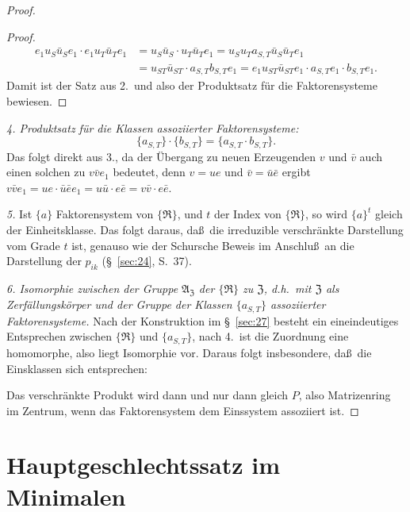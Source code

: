 \documentclass[12pt,a4paper]{article}
\theoremstyle{plain}
\theoremstyle{definition}
\theoremstyle{remark}
\begin{document}
\begin{proof}
\begin{proof}
\begin{align*}
e_{1}u_{S}\bar{u}_{S}e_{1} \cdot e_{1}u_{T}\bar{u}_{T}e_{1}
&= u_{S}\bar{u}_{S} \cdot u_{T}\bar{u}_{T}e_{1}
= u_{S}u_{T}a_{S,T}\bar{u}_{S}\bar{u}_{T}e_{1} \\
&= u_{ST}\bar{u}_{ST} \cdot a_{S,T}b_{S,T}e_{1}
= e_{1}u_{ST}\bar{u}_{ST}e_{1} \cdot a_{S,T}e_{1} \cdot b_{S,T}e_{1}.
\end{align*}
Damit ist der Satz aus 2.\ und also der Produktsatz f\"ur die
Faktorensysteme bewiesen.
\end{proof}

\textit{4. Produktsatz f\"ur die Klassen assoziierter Faktorensysteme:}
\[
\{a_{S,T}\} \cdot \{b_{S,T}\} = \{a_{S,T} \cdot b_{S,T}\}.
\]
Das folgt direkt aus 3., da der \"Ubergang zu neuen Erzeugenden
$v$ und $\bar{v}$ auch einen solchen zu $v\bar{v}e_{1}$ bedeutet, denn
$v = ue$ und $\bar{v} = \bar{u}\bar{e}$ ergibt
$v\bar{v}e_{1} = ue \cdot \bar{u}\bar{e}e_{1} = u\bar{u} \cdot e\bar{e} = v\bar{v} \cdot e\bar{e}$.

\textit{5.} Ist $\{a\}$ Faktorensystem von $\{\mathfrak{R}\}$, und $t$ der Index von
$\{\mathfrak{R}\}$, so wird $\{a\}^{t}$ gleich der Einheitsklasse. Das folgt
daraus, da\ss\ die irreduzible verschr\"ankte Darstellung vom Grade $t$
ist, genauso wie der Schursche Beweis im Anschlu\ss\ an die
Darstellung der $p_{ik}$ (\S~\ref{sec:24}, S.~37).

\textit{6. Isomorphie zwischen der Gruppe $\mathfrak{A}_{\mathfrak{Z}}$ der $\{\mathfrak{R}\}$ zu
$\mathfrak{Z}$, d.h.\ mit $\mathfrak{Z}$ als Zerf\"allungsk\"orper und der Gruppe der
Klassen $\{a_{S,T}\}$ assoziierter Faktorensysteme.} Nach der
Konstruktion im \S~\ref{sec:27} besteht ein eineindeutiges
Entsprechen zwischen $\{\mathfrak{R}\}$ und $\{a_{S,T}\}$, nach 4.\ ist die
Zuordnung eine homomorphe, also liegt Isomorphie vor. Daraus
folgt insbesondere, da\ss\ die Einsklassen sich entsprechen:

Das verschr\"ankte Produkt wird dann und nur dann gleich $P$, also
Matrizenring im Zentrum, wenn das Faktorensystem dem
Einssystem assoziiert ist.
\end{proof}

\newpage
\section{Hauptgeschlechtssatz im Minimalen}\label{sec:29}
\end{document}
